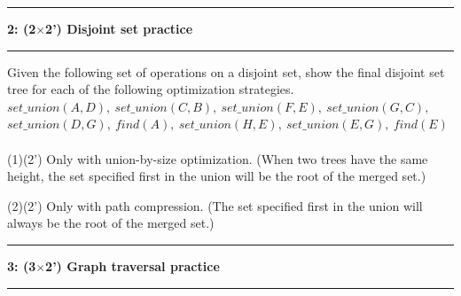 \documentclass[10.5pt]{article}
\newcommand\question[2]{\vspace{.25in}\hrule\textbf{#1: #2}\vspace{.5em}\hrule\vspace{.10in}}
\begin{document}
\pagebreak
\question{2}{(2$\times$2') Disjoint set practice}
Given the following set of operations on a disjoint set,
show the final disjoint set tree for each of the following optimization strategies.\\
$set\_union(A, D),\ set\_union(C, B),\ set\_union(F, E),\ set\_union (G, C),$\\
$set\_union(D,G),\ find(A),\ set\_union(H, E),\ set\_union(E,G),\ find(E)$\\
\\
(1)(2') Only with union-by-size optimization. (When two trees have the same height, the set specified first in the union will be the root of the merged set.)\\
\begin{center}
\end{center}
(2)(2') Only with path compression. (The set specified first in the union will always be
the root of the merged set.)\\
\begin{center}
\end{center}
\pagebreak

\question{3}{(3$\times$2') Graph traversal practice}
\end{document}
